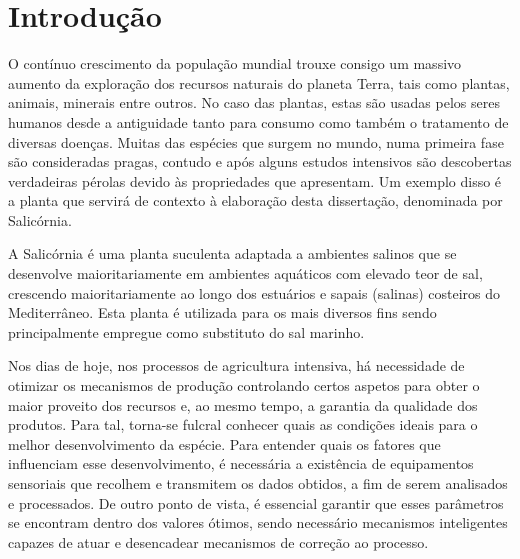 \chapter{Introdução}



O contínuo crescimento da população mundial trouxe consigo um massivo aumento da exploração dos recursos naturais do planeta Terra, tais como plantas, animais, minerais entre outros. No caso das plantas, estas são usadas pelos seres humanos desde a antiguidade tanto para consumo como também o tratamento de diversas doenças. Muitas das espécies que surgem no mundo, numa primeira fase são consideradas pragas, contudo e após alguns estudos intensivos são descobertas verdadeiras pérolas devido às propriedades que apresentam. Um exemplo disso é a planta que servirá de contexto à elaboração desta dissertação, denominada por Salicórnia. 









A Salicórnia é uma planta suculenta adaptada a ambientes salinos que se desenvolve maioritariamente em ambientes aquáticos com elevado teor de sal, crescendo maioritariamente ao longo dos estuários e sapais (salinas) costeiros do Mediterrâneo. Esta planta é utilizada para os mais diversos fins sendo principalmente empregue como substituto do sal marinho. 


Nos dias de hoje, nos processos de agricultura intensiva, há necessidade de otimizar os mecanismos de produção controlando certos aspetos para obter o maior proveito dos recursos e, ao mesmo tempo, a garantia da qualidade dos produtos. Para tal, torna-se fulcral conhecer quais as condições ideais para o melhor desenvolvimento da espécie. Para entender quais os fatores que influenciam esse desenvolvimento, é necessária a existência de equipamentos sensoriais que recolhem e transmitem os dados obtidos, a fim de serem analisados e processados. De outro ponto de vista, é essencial garantir que esses parâmetros se encontram dentro dos valores ótimos, sendo necessário mecanismos inteligentes capazes de atuar e desencadear mecanismos de correção ao processo. 


